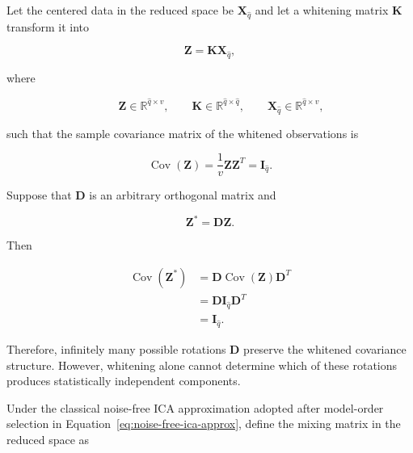 \documentclass[english]{pwr_wmat_praca_dyplomowa}
\theoremstyle{definition}
\theoremstyle{remark}
\begin{document}
Let the centered data in the reduced space be $\mathbf{X}_{\widehat{q}}$ and let a whitening matrix $\mathbf{K}$ transform it into

\begin{equation}
    \mathbf{Z} = \mathbf{K}\mathbf{X}_{\widehat{q}},
    \label{eq:ica-whitening}
\end{equation}

where 

\begin{equation}
    \qquad \mathbf{Z} \in \mathbb{R}^{\widehat{q} \times v}
    , \qquad \mathbf{K} \in \mathbb{R}^{\widehat{q} \times \widehat{q}}
    , \qquad \mathbf{X}_{\widehat{q}} \in \mathbb{R}^{\widehat{q} \times v},
\end{equation}

such that the sample covariance matrix of the whitened observations is

\begin{equation}
    \operatorname{Cov}(\mathbf{Z}) = \frac{1}{v}\mathbf{Z}\mathbf{Z}^T = \mathbf{I}_{\widehat{q}}.
    \label{eq:whitened-covariance-pica}
\end{equation}

Suppose that $\mathbf{D}$ is an arbitrary orthogonal matrix and

\begin{equation}
    \mathbf{Z}^{\ast} = \mathbf{D}\mathbf{Z}.
\end{equation}

Then

\begin{equation}
    \begin{aligned}
        \operatorname{Cov}\left(\mathbf{Z}^{\ast}\right) &= \mathbf{D} \operatorname{Cov}(\mathbf{Z}) \mathbf{D}^T \\
        &= \mathbf{D} \mathbf{I}_{\widehat{q}} \mathbf{D}^T \\
        &= \mathbf{I}_{\widehat{q}}.
    \end{aligned}
\end{equation}

Therefore, infinitely many possible rotations $\mathbf{D}$ preserve the whitened covariance structure. However, whitening alone cannot determine which of these rotations produces statistically independent components.

\newpage
Under the classical noise-free ICA approximation adopted after model-order selection in Equation~\eqref{eq:noise-free-ica-approx}, define the mixing matrix in the reduced space as
\end{document}
